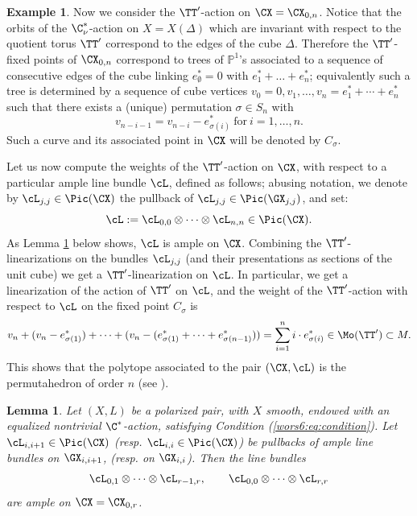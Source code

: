 \documentclass[reqno]{amsproc}
\newtheorem{lemma}[theorem]{Lemma}
\theoremstyle{definition}
\newtheorem{example}[theorem]{Example}
\begin{document}
\begin{example}
Now we consider the $\TT'$-action on $\CX=\CX_{0,n}$. Notice that the orbits of the $\C^*_\nu$-action  on $X=X(\Delta)$ which are invariant with respect to the quotient torus $\TT'$ correspond to the edges of the cube $\Delta$. Therefore the $\TT'$-fixed points of $\CX_{0,n}$  correspond to trees of $\mathbb{P}^1$'s associated to a sequence of consecutive edges of the cube linking $e^*_\emptyset=0$ with $e^*_1+\dots +e^*_n$; equivalently such a tree is determined by a sequence of cube vertices $v_0=0,v_1,\dots,v_n=e^*_1+\cdots+e^*_n$ such that there exists a (unique) permutation $\sigma\in S_n$ with $$v_{n-i-1}=v_{n-i}-e^*_{\sigma(i)}\ \text{for}\ i=1,\dots,n.$$ 
Such a curve and its associated point in $\CX$ will be denoted by $C_\sigma$. 

Let us now compute the weights of the $\TT'$-action on $\CX$, with respect to a particular ample line bundle $\cL$, defined as follows; abusing notation, we denote by $\cL_{j,j}\in \Pic(\CX)$ the pullback of $\cL_{j,j}\in \Pic(\GX_{j,j})$, and set:
$$\cL:=\cL_{0,0}\otimes \dots \otimes \cL_{n,n}\in \Pic(\CX).$$
As Lemma \ref{wors6:lem:ampleg} below shows, $\cL$ is ample on $\CX$. Combining the  $\TT'$-linearizations on the bundles $\cL_{j,j}$ (and their presentations as sections of the unit cube) we get a $\TT'$-linearization on $\cL$. 
In particular, we get a linearization of the action of $\TT'$ on $\cL$, and the weight of the $\TT'$-action with respect to $\cL$ on the fixed point $C_\sigma$ is 
    $$v_n+(v_n-e^*_{\sigma(1)})+\cdots+(v_n-(e^*_{\sigma(1)}+\cdots+e^*_{\sigma(n-1)}))=\sum_{i=1}^n i\cdot e^*_{\sigma(i)}\in \Mo(\TT')\subset M.$$
   This shows that the polytope associated to the pair $(\CX,\cL)$ is the permutahedron of order $n$ (see \cite[9.2]{wors6-Ziegler}).
\end{example}

\begin{lemma}\label{wors6:lem:ampleg}
Let $(X,L)$ be a polarized pair, with $X$ smooth, endowed with an equalized nontrivial $\C^*$-action, satisfying Condition (\ref{wors6:eq:condition}).
Let $\cL_{i,i+1} \in \Pic(\CX)$ (resp. $\cL_{i,i} \in \Pic(\CX)$) be pullbacks of ample line bundles on $\GX_{i,i+1}$, (resp. on $\GX_{i,i}$).  Then the line bundles
\[
\cL_{0,1}\otimes\cdots\otimes\cL_{r-1,r}, \qquad \cL_{0,0}\otimes\cdots\otimes\cL_{r,r}
\]
are ample on $\CX=\CX_{0,r}$.
\end{lemma}
\end{document}

